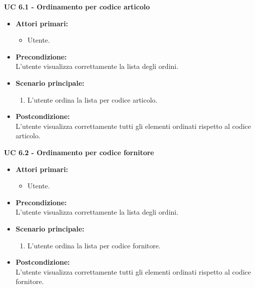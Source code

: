\vspace{0.4cm}

\noindent \textbf{\large UC 6.1 - Ordinamento per codice articolo }
\label{uc:ordinamento-codice-articolo}
\begin{itemize}

	\item \textbf{Attori primari: }
		\begin{itemize}
			\item Utente.
		\end{itemize}

	\item \textbf{Precondizione: }\\[0.3cm]
		L'utente visualizza correttamente la lista degli ordini.
\item \textbf{Scenario principale: }
		\begin{enumerate}
			\item L'utente ordina la lista per codice articolo.
		\end{enumerate}
		

	\item \textbf{Postcondizione: }\\[0.3cm]
		L'utente visualizza correttamente tutti gli elementi ordinati rispetto al codice articolo.

\end{itemize}

\vspace{0.4cm}

\noindent \textbf{\large UC 6.2 - Ordinamento per codice fornitore }
\label{uc:ordinamento-codice-fornitore}
\begin{itemize}

	\item \textbf{Attori primari: }
		\begin{itemize}
			\item Utente.
		\end{itemize}

	\item \textbf{Precondizione: }\\[0.3cm]
		L'utente visualizza correttamente la lista degli ordini.

	\item \textbf{Scenario principale: }
		\begin{enumerate}
			\item L'utente ordina la lista per codice fornitore.
		\end{enumerate}
		

	\item \textbf{Postcondizione: }\\[0.3cm]
		L'utente visualizza correttamente tutti gli elementi ordinati rispetto al codice fornitore.

\end{itemize}

